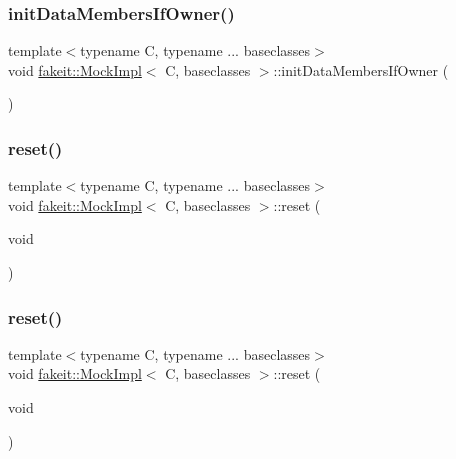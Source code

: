 \subsubsection{\texorpdfstring{initDataMembersIfOwner()}{initDataMembersIfOwner()}\hspace{0.1cm}{\footnotesize\ttfamily [9/9]}}
{\footnotesize\ttfamily template$<$typename C, typename ... baseclasses$>$ \\
void \mbox{\hyperlink{classfakeit_1_1MockImpl}{fakeit\+::\+Mock\+Impl}}$<$ C, baseclasses $>$\+::init\+Data\+Members\+If\+Owner (\begin{DoxyParamCaption}{ }\end{DoxyParamCaption})\hspace{0.3cm}{\ttfamily [inline]}}

\mbox{\label{classfakeit_1_1MockImpl_aad69a9c36fc64d0890f21ff15318a206}} 
\subsubsection{\texorpdfstring{reset()}{reset()}\hspace{0.1cm}{\footnotesize\ttfamily [1/9]}}
{\footnotesize\ttfamily template$<$typename C, typename ... baseclasses$>$ \\
void \mbox{\hyperlink{classfakeit_1_1MockImpl}{fakeit\+::\+Mock\+Impl}}$<$ C, baseclasses $>$\+::reset (\begin{DoxyParamCaption}\item[{void}]{ }\end{DoxyParamCaption})\hspace{0.3cm}{\ttfamily [inline]}}

\mbox{\label{classfakeit_1_1MockImpl_aad69a9c36fc64d0890f21ff15318a206}} 
\subsubsection{\texorpdfstring{reset()}{reset()}\hspace{0.1cm}{\footnotesize\ttfamily [2/9]}}
{\footnotesize\ttfamily template$<$typename C, typename ... baseclasses$>$ \\
void \mbox{\hyperlink{classfakeit_1_1MockImpl}{fakeit\+::\+Mock\+Impl}}$<$ C, baseclasses $>$\+::reset (\begin{DoxyParamCaption}\item[{void}]{ }\end{DoxyParamCaption})\hspace{0.3cm}{\ttfamily [inline]}}

